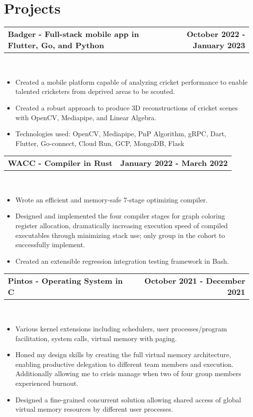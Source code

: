 \documentclass[letterpaper,oneside,10.8pt]{article}
\makeatletter
\newcommand{\titleAndDate}[2]{
  \small{
  \vspace{-1pt}
    \begin{tabular*}{1\textwidth}{l@{\extracolsep{\fill}}r}
      \textbf{#1} & \textbf{#2} \\
    \end{tabular*}\vspace{-1pt} \\
  }
}
\newcommand{\normalText}[1]{
  \small{
    {#1}
  }\vspace{-1pt}\\
}
\makeatother
\begin{document}
\section{Projects}
\titleAndDate{Badger - Full-stack mobile app in Flutter, Go, and Python}{October 2022 - January 2023}
\begin{itemize}[leftmargin=10pt]
    \item\normalText{Created a mobile platform capable of analyzing cricket performance to enable talented cricketers from deprived areas to be scouted. }
    \item\normalText{Created a robust approach to produce 3D reconstructions of cricket scenes with OpenCV, Mediapipe, and Linear Algebra. }
    \item\normalText{Technologies used: OpenCV, Mediapipe, PnP Algorithm, gRPC, Dart, Flutter, Go-connect, Cloud Run, GCP, MongoDB, Flask}
\end{itemize}


\vspace{4pt}

\titleAndDate{WACC - Compiler in Rust}{January 2022 - March 2022}
\begin{itemize}[leftmargin=10pt]
    \item\normalText{Wrote an efficient and memory-safe 7-stage optimizing compiler. }
    \item\normalText{Designed and implemented the four compiler stages for graph coloring register allocation, dramatically increasing execution speed of compiled executables through minimizing stack use; only group in the cohort to successfully implement.}
    \item\normalText{Created an extensible regression integration testing framework in Bash. }
\end{itemize}

\vspace{4pt}
    
\titleAndDate{Pintos - Operating System in C}{October 2021 - December 2021}
\begin{itemize}[leftmargin=10pt]
    \item\normalText{Various kernel extensions including schedulers, user processes/program facilitation, system calls, virtual memory with paging. }
    \item\normalText{Honed my design skills by creating the full virtual memory architecture, enabling productive delegation to different team members and execution. Additionally allowing me to crisis manage when two of four group members experienced burnout. }
    \item\normalText{Designed a fine-grained concurrent solution allowing shared access of global virtual memory resources by different user processes. }
\end{itemize}
    
\end{document}

